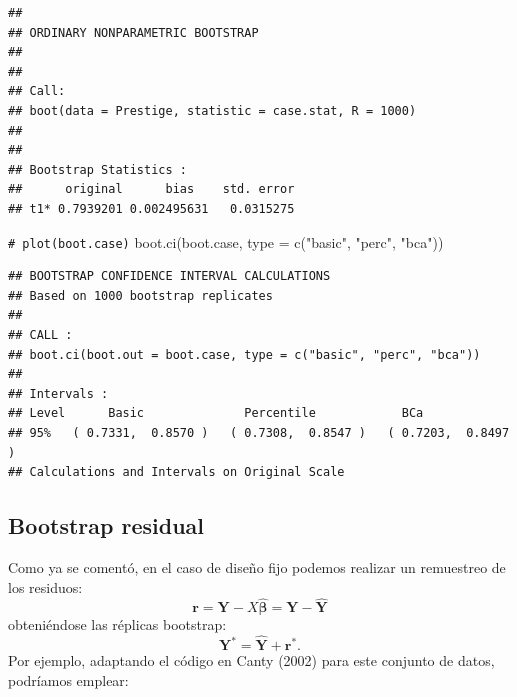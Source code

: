 \documentclass[
]{book}
\newenvironment{Shaded}{\begin{snugshade}}{\end{snugshade}}
\newcommand{\AttributeTok}[1]{\textcolor[rgb]{0.77,0.63,0.00}{#1}}
\newcommand{\CommentTok}[1]{\textcolor[rgb]{0.56,0.35,0.01}{\textit{#1}}}
\newcommand{\FunctionTok}[1]{\textcolor[rgb]{0.00,0.00,0.00}{#1}}
\newcommand{\NormalTok}[1]{#1}
\newcommand{\StringTok}[1]{\textcolor[rgb]{0.31,0.60,0.02}{#1}}
\theoremstyle{break}
\theoremstyle{nonumberplain}
\renewcommand{\CommentTok}[1]{\textcolor[rgb]{0.41,0.41,0.41}{\texttt{#1}}}
\begin{document}
\begin{verbatim}
## 
## ORDINARY NONPARAMETRIC BOOTSTRAP
## 
## 
## Call:
## boot(data = Prestige, statistic = case.stat, R = 1000)
## 
## 
## Bootstrap Statistics :
##      original      bias    std. error
## t1* 0.7939201 0.002495631   0.0315275
\end{verbatim}

\begin{Shaded}
\begin{Highlighting}[]
\CommentTok{\# plot(boot.case)}
\FunctionTok{boot.ci}\NormalTok{(boot.case, }\AttributeTok{type =} \FunctionTok{c}\NormalTok{(}\StringTok{"basic"}\NormalTok{, }\StringTok{"perc"}\NormalTok{, }\StringTok{"bca"}\NormalTok{))}
\end{Highlighting}
\end{Shaded}

\begin{verbatim}
## BOOTSTRAP CONFIDENCE INTERVAL CALCULATIONS
## Based on 1000 bootstrap replicates
## 
## CALL : 
## boot.ci(boot.out = boot.case, type = c("basic", "perc", "bca"))
## 
## Intervals : 
## Level      Basic              Percentile            BCa          
## 95%   ( 0.7331,  0.8570 )   ( 0.7308,  0.8547 )   ( 0.7203,  0.8497 )  
## Calculations and Intervals on Original Scale
\end{verbatim}

\hypertarget{boot-residual}{%
\subsection{Bootstrap residual}\label{boot-residual}}

Como ya se comentó, en el caso de diseño fijo podemos realizar un remuestreo de los residuos:
\[\mathbf{r} = \mathbf{Y} - X\hat{\mathbf{\beta}} = \mathbf{Y} - \hat{\mathbf{Y}}\]
obteniéndose las réplicas bootstrap:
\[\mathbf{Y}^{\ast} = \hat{\mathbf{Y}} + \mathbf{r}^{\ast}.\]
Por ejemplo, adaptando el código en Canty (2002) para este conjunto de datos, podríamos emplear:
\end{document}
